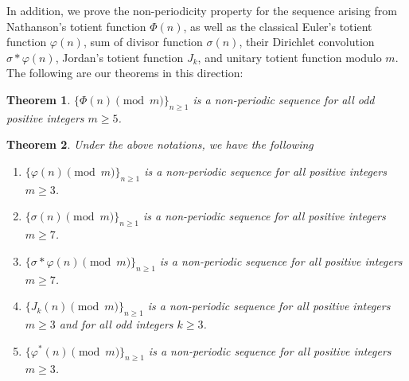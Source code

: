 \documentclass[12pt,reqno]{amsart}
\newtheorem{theorem}{Theorem}[section]
\begin{document}
In addition, we prove the non-periodicity property for the sequence arising from Nathanson’s totient function $\Phi(n)$, as well as the classical Euler's totient function $\varphi(n)$, sum of divisor function $\sigma(n)$, their Dirichlet convolution $\sigma * \varphi(n)$, Jordan's totient function $J_k$, and unitary totient function modulo $m$. The following are our theorems in this direction:
\begin{theorem}\label{thm1.4}
$\{\Phi(n) \pmod{m}\}_{n\geq 1}$ is a non-periodic sequence for all odd positive integers $m\geq 5$.
\end{theorem}
\begin{theorem}\label{thm1.5} Under the above notations, we have the following
\noindent
\begin{enumerate}
    \item[\upshape(1)]  $\{\varphi(n) \pmod{m}\}_{n\geq 1}$ is a non-periodic sequence for all positive integers $m\geq 3$. 
    \item[\upshape(2)]  $\{\sigma(n) \pmod{m}\}_{n\geq 1}$ is a non-periodic sequence for all positive integers $m\geq 7$. 
    \item[\upshape(3)] $\{\sigma*\varphi(n) \pmod{m}\}_{n\geq 1}$ is a non-periodic sequence for all positive integers $m\geq 7$. 
    \item[\upshape(4)]  $\{J_k(n) \pmod{m}\}_{n\geq 1}$ is a non-periodic sequence for all positive integers $m\geq 3$ 
    and for all odd integers $k\geq3$.  
    \item[\upshape(5)]  $\{\varphi^*(n) \pmod{m}\}_{n\geq 1}$ is a non-periodic sequence for all positive integers $m\geq 3$.
\end{enumerate}
\end{theorem}
\end{document}
